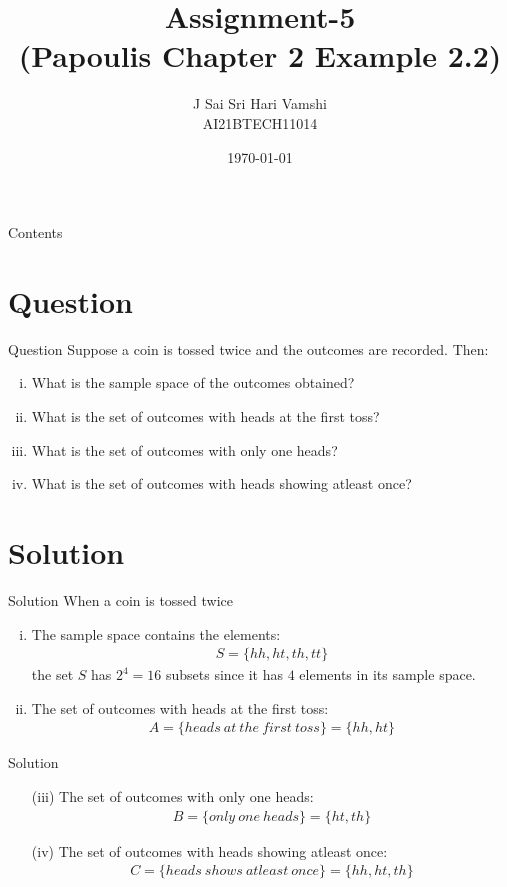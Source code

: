 \documentclass{beamer}
\title{Assignment-5\\(Papoulis Chapter 2 Example 2.2)}
\author{J Sai Sri Hari Vamshi\\ AI21BTECH11014}
\date{\today}
\begin{document}
\begin{frame}
    \titlepage 
\end{frame}



\begin{frame}{Contents}
    \tableofcontents
\end{frame}

\section{Question}
\begin{frame}{Question}
	Suppose a coin is tossed twice and the outcomes are recorded. Then:
		\begin{enumerate}[(i)]
		\item What is the sample space of the outcomes obtained?
		\item What is the set of outcomes with heads at the first toss?
		\item What is the set of outcomes with only one heads?
		\item What is the set of outcomes with heads showing atleast once?
	\end{enumerate}
\end{frame}

\section{Solution}
\begin{frame}{Solution}
When a coin is tossed twice
	\begin{enumerate}[(i)]
		\item The sample space contains the elements:
		\begin{align*}
			S = \{hh,ht,th,tt\}
		\end{align*}
		the set $S$ has $2^4 = 16$ subsets since it has $4$ elements in its sample space.
		\item The set of outcomes with heads at the first toss:
		\begin{align*}
			A = \{heads\ at\ the\ first\ toss\} = \{hh,ht\}
		\end{align*}
	\end{enumerate}
\end{frame}
\begin{frame}{Solution}
	\begin{enumerate}
	\item[(iii)] The set of outcomes with only one heads:
		\begin{align*}
			B = \{only\ one\ heads\} = \{ht,th\}
		\end{align*}
	\item[(iv)] The set of outcomes with heads showing atleast once:
		\begin{align*}
			C = \{heads\ shows\ atleast\ once\} = \{hh,ht,th\}
		\end{align*}
	\end{enumerate}

\end{frame}
\end{document}
